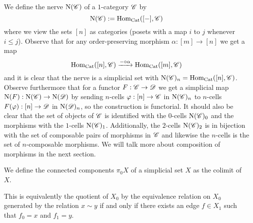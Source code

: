 \documentclass[../../thesis.tex]{subfiles}
\begin{document}
\begin{example}
\end{example}
\begin{example}\label{NerveDef}
    We define the nerve $\mathrm{N}(\mathscr{C})$ of a $1$-category $\mathscr{C}$ by
    \[
        \mathrm{N}(\mathscr{C}) : = \mathrm{Hom}_{\mathrm{Cat}}([{-}], \mathscr{C})
    \]
    where we view the sets $[n]$ as categories (posets with a map $i$ to $j$ whenever $i\leq j$).
    Observe that for any order-preserving morphism $\alpha : [m] \to [n]$ we get a map
    \[
        \mathrm{Hom}_{\mathrm{Cat}}([n], \mathscr{C}) \xrightarrow{{-} \circ \alpha} \mathrm{Hom}_{\mathrm{Cat}}([m], \mathscr{C})
    \]
    and it is clear that the nerve is a simplicial set with $\mathrm{N}(\mathscr{C})_n = \mathrm{Hom}_{\mathrm{Cat}}([n], \mathscr{C})$.
    \newline
    Observe furthermore that for a functor $F: \mathscr{C} \to \mathscr{D}$ we get a simplicial map $\mathrm{N}(F):\mathrm{N}(\mathscr{C}) \to \mathrm{N}(\mathscr{D})$ by sending $n$-cells $\varphi : [n] \to \mathscr{C}$ in $\mathrm{N}(\mathscr{C})_n$ to $n$-cells $F(\varphi) : [n] \to \mathscr{D}$ in $\mathrm{N}(\mathscr{D})_n$, so the construction is functorial.
    It should also be clear that the set of objects of $\mathscr{C}$ is identified with the $0$-cells $\mathrm{N}(\mathscr{C})_0$ and the morphisms with the $1$-cells $\mathrm{N}(\mathscr{C})_1$.
    Additionally, the $2$-cells $\mathrm{N}(\mathscr{C})_2$ is in bijection with the set of composable pairs of morphisms in $\mathscr{C}$ and likewise the $n$-cells is the set of $n$-composable morphisms.
    We will talk more about composition of morphisms in the next section.
\end{example}
\begin{definition}
    We define the connected components $\pi_0X$ of a simplicial set $X$ as the colimit of $X$.
\end{definition}
This is equivalently the quotient of $X_0$ by the equivalence relation on $X_0$ generated by the relation $x \sim y$ if and only if there exists an edge $f \in X_1$ such that $f_0=x$ and $f_1=y$.
\end{document}
